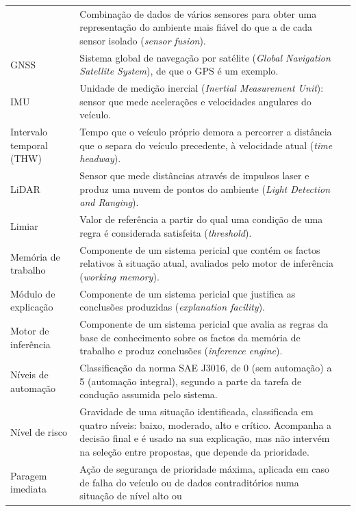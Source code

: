 {\begin{longtable}{@{}L{4.4cm}VL{10.0cm}@{}}
    & Combinação de dados de vários sensores para obter uma representação
      do ambiente mais fiável do que a de cada sensor isolado
      (\emph{sensor fusion}). \\ \linhasep
  GNSS
    & Sistema global de navegação por satélite (\emph{Global Navigation
      Satellite System}), de que o GPS é um exemplo. \\ \linhasep
  IMU
    & Unidade de medição inercial (\emph{Inertial Measurement Unit}):
      sensor que mede acelerações e velocidades angulares do veículo. \\ \linhasep
  Intervalo temporal (THW)
    & Tempo que o veículo próprio demora a percorrer a distância que o
      separa do veículo precedente, à velocidade atual (\emph{time
      headway}). \\ \linhasep
  LiDAR
    & Sensor que mede distâncias através de impulsos laser e produz uma
      nuvem de pontos do ambiente (\emph{Light Detection and
      Ranging}). \\ \linhasep
  Limiar
    & Valor de referência a partir do qual uma condição de uma regra é
      considerada satisfeita (\emph{threshold}). \\ \linhasep
  Memória de trabalho
    & Componente de um sistema pericial que contém os factos relativos à
      situação atual, avaliados pelo motor de inferência (\emph{working
      memory}). \\ \linhasep
  Módulo de explicação
    & Componente de um sistema pericial que justifica as conclusões
      produzidas (\emph{explanation facility}). \\ \linhasep
  Motor de inferência
    & Componente de um sistema pericial que avalia as regras da base de
      conhecimento sobre os factos da memória de trabalho e produz
      conclusões (\emph{inference engine}). \\ \linhasep
  Níveis de automação
    & Classificação da norma SAE J3016, de 0 (sem automação) a 5
      (automação integral), segundo a parte da tarefa de condução assumida
      pelo sistema. \\ \linhasep
  Nível de risco
    & Gravidade de uma situação identificada, classificada em quatro níveis:
      baixo, moderado, alto e crítico. Acompanha a decisão final e é usado
      na sua explicação, mas não intervém na seleção entre propostas, que
      depende da prioridade. \\ \linhasep
  Paragem imediata
    & Ação de segurança de prioridade máxima, aplicada em caso de falha do
      veículo ou de dados contraditórios numa situação de nível alto ou

\end{longtable}}
